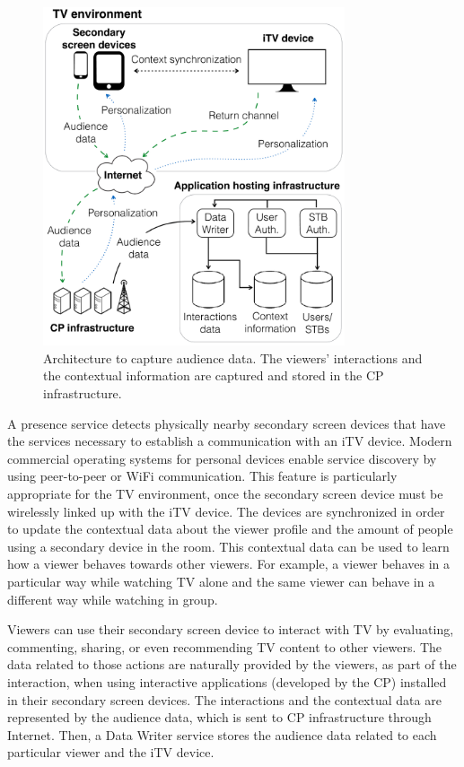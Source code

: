 \documentclass[conference,a4paper]{IEEEtran}
\begin{document}
\begin{figure}[!t]
	\centering
	\includegraphics[width=3.5in]{img/architecture.pdf}
	\caption{Architecture to capture audience data. The viewers' interactions and the contextual information are captured and stored in the CP infrastructure.}
	\label{fig_architecture}
\end{figure}

A presence service detects physically nearby secondary screen devices that have the services necessary to establish a communication with an iTV device. Modern commercial operating systems for personal devices enable service discovery by using peer-to-peer or WiFi communication. This feature is particularly appropriate for the TV environment, once the secondary screen device must be wirelessly linked up with the iTV device. The devices are synchronized in order to update the contextual data about the viewer profile and the amount of people using a secondary device in the room. This contextual data can be used to learn how a viewer behaves towards other viewers. For example, a viewer behaves in a particular way while watching TV alone and the same viewer can behave in a different way while watching in group.

Viewers can use their secondary screen device to interact with TV by evaluating, commenting, sharing, or even recommending TV content to other viewers. The data related to those actions are naturally provided by the viewers, as part of the interaction, when using interactive applications (developed by the CP) installed in their secondary screen devices. The interactions and the contextual data are represented by the audience data, which is sent to CP infrastructure through Internet. Then, a Data Writer service stores the audience data related to each particular viewer and the iTV device.
\end{document}
